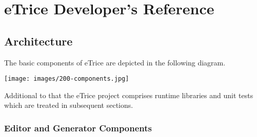 \chapter{eTrice Developer's Reference}

\section{Architecture}

The basic components of eTrice are depicted in the following diagram.

\texttt{[image: images/200-components.jpg]}

Additional to that the eTrice project comprises runtime libraries and unit tests which are treated in subsequent sections.

\subsection{Editor and Generator Components}

